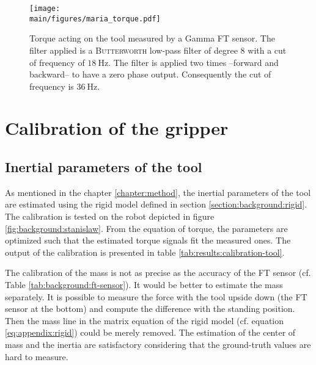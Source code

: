 \documentclass[/home/francois/latex/report/main.tex]{subfiles}
\begin{document}
\begin{figure}[ht!]
  \centering
  \texttt{[image: \\main/figures/maria\_torque.pdf]}
  \caption{Torque acting on the tool measured by a Gamma \ac{FT} sensor. The  filter applied is a \textsc{Butterworth} low-pass filter of degree 8 with a cut of frequency of $18 \ \si{\hertz}$. The filter is applied two times –forward and backward– to have a zero phase output. Consequently the cut of frequency is $36 \ \si{\hertz}$. \label{fig:results:force-torque}}
  \label{fig:results:torque}
\end{figure}

\clearpage

\section{Calibration of the gripper}
\label{section:results:calibration}

\subsection{Inertial parameters of the tool}

As mentioned in the chapter \ref{chapter:method}, the inertial parameters of the tool are estimated using the rigid model defined in section \ref{section:background:rigid}. The calibration is tested on the robot depicted in figure \ref{fig:background:stanislaw}. From the equation of torque, the parameters are optimized such that the estimated torque signals fit the measured ones. The output of the calibration is presented in table \ref{tab:results:calibration-tool}.

The calibration of the mass is not as precise as the accuracy of the \ac{FT} sensor (cf. Table \ref{tab:background:ft-sensor}). It would be better to estimate the mass separately. It is possible to measure the force with the tool upside down (the \ac{FT} sensor at the bottom) and compute the difference with the standing position. Then the mass line in the matrix equation of the rigid model (cf. equation \ref{eq:appendix:rigid}) could be merely removed. The estimation of the center of mass and the inertia are satisfactory considering that the ground-truth values are hard to measure.
\end{document}
